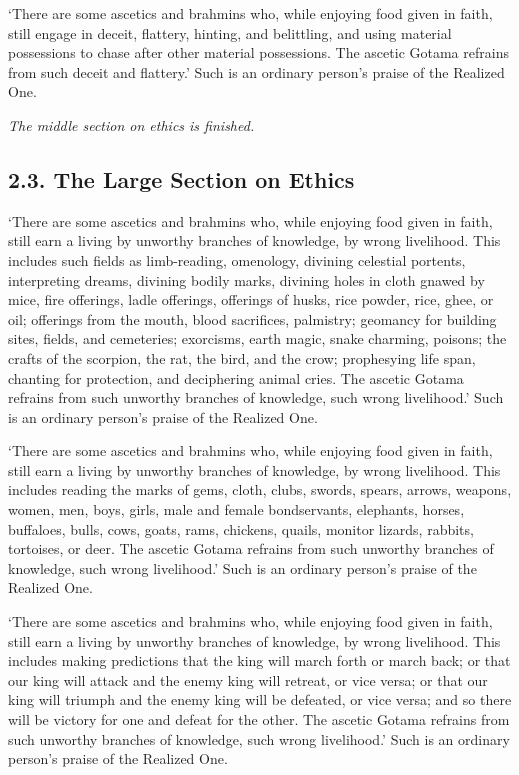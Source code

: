 \documentclass[12pt,openany]{book}%
\newcommand*{\scendsection}[1]{\begin{center}\textit{#1}\end{center}}
\begin{document}
‘There are some ascetics and brahmins who, while enjoying food given in faith, still engage in deceit, flattery, hinting, and belittling, and using material possessions to chase after other material possessions. The ascetic Gotama refrains from such deceit and flattery.’ Such is an ordinary person’s praise of the Realized One. 

\scendsection{The middle section on ethics is finished. }

\subsection*{2.3. The Large Section on Ethics }

‘There are some ascetics and brahmins who, while enjoying food given in faith, still earn a living by unworthy branches of knowledge, by wrong livelihood. This includes such fields as limb-reading, omenology, divining celestial portents, interpreting dreams, divining bodily marks, divining holes in cloth gnawed by mice, fire offerings, ladle offerings, offerings of husks, rice powder, rice, ghee, or oil; offerings from the mouth, blood sacrifices, palmistry; geomancy for building sites, fields, and cemeteries; exorcisms, earth magic, snake charming, poisons; the crafts of the scorpion, the rat, the bird, and the crow; prophesying life span, chanting for protection, and deciphering animal cries. The ascetic Gotama refrains from such unworthy branches of knowledge, such wrong livelihood.’ Such is an ordinary person’s praise of the Realized One. 

‘There are some ascetics and brahmins who, while enjoying food given in faith, still earn a living by unworthy branches of knowledge, by wrong livelihood. This includes reading the marks of gems, cloth, clubs, swords, spears, arrows, weapons, women, men, boys, girls, male and female bondservants, elephants, horses, buffaloes, bulls, cows, goats, rams, chickens, quails, monitor lizards, rabbits, tortoises, or deer. The ascetic Gotama refrains from such unworthy branches of knowledge, such wrong livelihood.’ Such is an ordinary person’s praise of the Realized One. 

‘There are some ascetics and brahmins who, while enjoying food given in faith, still earn a living by unworthy branches of knowledge, by wrong livelihood. This includes making predictions that the king will march forth or march back; or that our king will attack and the enemy king will retreat, or vice versa; or that our king will triumph and the enemy king will be defeated, or vice versa; and so there will be victory for one and defeat for the other. The ascetic Gotama refrains from such unworthy branches of knowledge, such wrong livelihood.’ Such is an ordinary person’s praise of the Realized One. 
\end{document}

